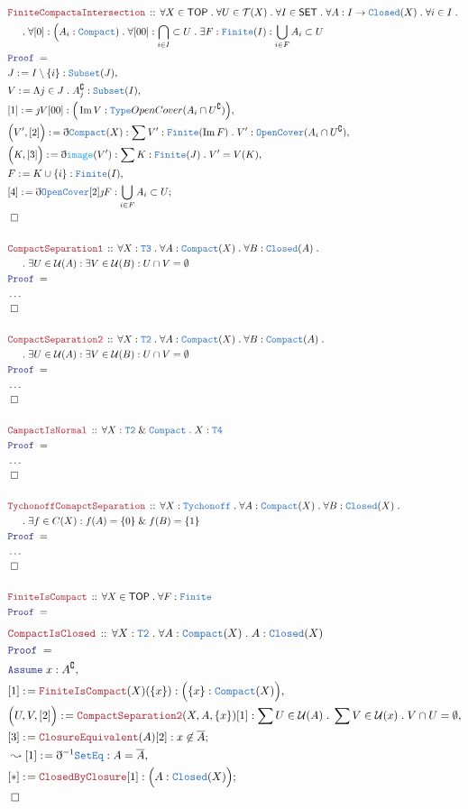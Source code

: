 \documentclass[12pt]{scrartcl}
\newcommand{\TYPE}[1]{\textcolor{NavyBlue}{\mathtt{#1}}}
\newcommand{\FUNC}[1]{\textcolor{Cerulean}{\mathtt{#1}}}
\newcommand{\LOGIC}[1]{\textcolor{Blue}{\mathtt{#1}}}
\newcommand{\THM}[1]{\textcolor{Maroon}{\mathtt{#1}}}
\renewcommand{\.}{\; . \;}
\newcommand{\de}{: \kern 0.1pc =}
\newcommand{\Theorem}[2]{& \THM{#1} \, :: \, #2 \\ & \Proof = \\ }
\newcommand{\NewLine}{\\ & \kern 1pc}
\newcommand{\Page}[1]{ \begin{align*} #1 \end{align*}   }
\newcommand{ \bd }{ \ByDef }
\newcommand{\NoProof}{ & \ldots \\ \EndProof}
\renewcommand{\And}{\; \& \;}
\newcommand{\Type}{\TYPE{Type}}
\DeclareMathOperator*{\im}{Im}
\renewcommand{\c}{\complement}
\newcommand{\Say}[3]{& #1 \de #2 : #3, \\}
\newcommand{\Conclude}[3]{& #1 \de #2 : #3; \\}
\newcommand{\Derive}[3]{& \leadsto #1 \de #2 : #3, \\}
\newcommand{\Assume}[2]{& \LOGIC{Assume} \; #1 : #2, \\}
\newcommand{\QED}{\; \square}
\newcommand{\EndProof}{& \QED \\}
\newcommand{\ByDef}{\eth}
\newcommand{\ByConstr}{\jmath}
\newcommand{\Proof}{\LOGIC{Proof} \; }
\newcommand{\SET}{\mathsf{SET}}
\newcommand{\TOP}{\mathsf{TOP}}
\newcommand{\T}{\mathcal{T}}
\newcommand{\U}{\mathcal{U}}
\begin{document}
\Page{
	\Theorem{FiniteCompactaIntersection}
	{
		\forall X \in \TOP \.
		\forall U \in \T(X) \.
		\forall I \in \SET \.
		\forall A : I \to \TYPE{Closed}(X) \.
		\forall i \in I \. \NewLine \. 
		\forall [0] : \Big(A_i : \TYPE{Compact}) \.
		\forall [00] : \bigcap_{i \in I} \subset U \.
		\exists F : \TYPE{Finite}(I) :
		\bigcup_{i \in F} A_i \subset U
	}
	\Say{J}{I \setminus \{i\}}{\TYPE{Subset}(J)}
	\Say{V}{\Lambda j \in J \.  A_j^\c }{\TYPE{Subset}(I)} 
	\Say{[1]}{\ByConstr V [00]}{ \Big( \im V : \Type{OpenCover}(A_i \cap U^\c)  \Big)}
	\Say{\Big( V', [2]\Big)}{ \bd \TYPE{Compact}(X)  }
	{
		\sum V' : \TYPE{Finite}(\im F) \. V' : \TYPE{OpenCover}(A_i \cap U^\c) 
	}
	\Say{\Big(K,[3]\Big)}{ \bd \FUNC{image}(V')}{ \sum  K : \TYPE{Finite}(J) \. V' = V(K)}
	\Say{F}{K \cup \{i\}}{\TYPE{Finite}(I)}
	\Conclude{[4]}{\bd \TYPE{OpenCover}[2]\ByConstr F}{ \bigcup_{i \in F} A_i \subset U }
	\EndProof
	\\
	\Theorem{CompactSeparation1}
	{
		\forall X : \TYPE{T3} \.
		\forall A : \TYPE{Compact}(X) \.
		\forall B : \TYPE{Closed}(A) \. \NewLine \. 
		\exists U \in \U(A) :
		\exists V \in \U(B) :
		U \cap V = \emptyset
	}
	\NoProof
	\\
	\Theorem{CompactSeparation2}
	{
		\forall X : \TYPE{T2} \.
		\forall A : \TYPE{Compact}(X) \.
		\forall B : \TYPE{Compact}(A) \. \NewLine \. 
		\exists U \in \U(A) :
		\exists V \in \U(B) :
		U \cap V = \emptyset
	}
	\NoProof
	\\
	\Theorem{CampactIsNormal}
	{
		\forall X : \TYPE{T2} \And \TYPE{Compact} \.
		X : \TYPE{T4}
	}
	\NoProof
	\\
	\Theorem{TychonoffComapctSeparation}
	{
		\forall X : \TYPE{Tychonoff} \. 
		\forall A : \TYPE{Compact}(X) \.
		\forall B : \TYPE{Closed}(X) \. \NewLine \. 
		\exists f  \in C(X) :
		f(A) = \{0\} \And f(B) = \{1\}
	}
	\NoProof
	\\
	\Theorem{FiniteIsCompact}
	{
		\forall X \in \TOP \.
		\forall F : \TYPE{Finite}
	}
}\Page{
	\Theorem{CompactIsClosed}
	{
		\forall X : \TYPE{T2} \.
		\forall A : \TYPE{Compact}(X) \.
		A : \TYPE{Closed}(X)
	}
	\Assume{x}{A^\c}
	\Say{[1]}{\THM{FiniteIsCompact}(X)(\{x\})}{\Big( \{x\} : \TYPE{Compact}(X) \Big)}
	\Say{\Big( U, V, [2] \Big)}{ \THM{CompactSeparation2}(X,A,\{x\})[1]}
	{
		\sum U \in \U(A) \. \sum V \in \U(x) \. V \cap U = \emptyset
	}
	\Conclude{[3]}{\THM{ClosureEquivalent}(A)[2]}
	{
		x \not \in \overline{A}
	}
	\Derive{[1]}{\bd^{-1} \TYPE{SetEq}}{A = \overline{A}}
	\Conclude{[*]}{\THM{ClosedByClosure}[1]}{\Big( A : \TYPE{Closed}(X)\Big)}
	\EndProof
	\\
}
\end{document}
